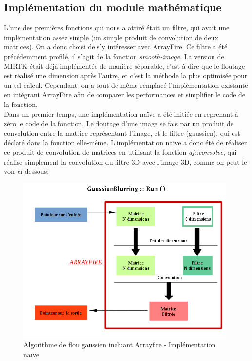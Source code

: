 \documentclass[10pt]{report}
\begin{document}
	\subsection{Implémentation du module mathématique}
	L'une des premières fonctions qui nous a attiré était un filtre, qui avait une implémentation assez simple (un simple produit de convolution de deux matrices). On a donc choisi de s'y intéresser avec ArrayFire.
	Ce filtre a été précédemment profilé, il s'agit de la fonction \textit{smooth-image}. La version de MIRTK était déjà implémentée de manière séparable, c'est-à-dire que le floutage est réalisé une dimension après l'autre, et c'est la méthode la plus optimisée pour un tel calcul. Cependant, on a tout de même remplacé l'implémentation existante en intégrant ArrayFire afin de comparer les performances et simplifier le code de la fonction. \\
	Dans un premier temps, une implémentation naïve a été initiée en reprenant à zéro le code de la fonction. Le floutage d'une image se fais par un produit de convolution entre la matrice représentant l'image, et le filtre (gaussien), qui est déclaré dans la fonction elle-même. L'implémentation naïve a donc été de réaliser ce produit de convolution de matrices en utilisant la fonction \textit{af::convolve}, qui réalise simplement la convolution du filtre 3D avec l'image 3D, comme on peut le voir ci-dessous:\\
	\begin{figure}[h!]
		\begin{center}
			\includegraphics[width=11cm]{Reports/figures/gaussianblurring.png}
		\end{center}	
		\caption{Algorithme de flou gaussien incluant Arrayfire - Implémentation naïve}
		\label{Algorithme de flou gaussien incluant Arrayfire - Implémentation naïve}
	\end{figure}~\par
\end{document}
